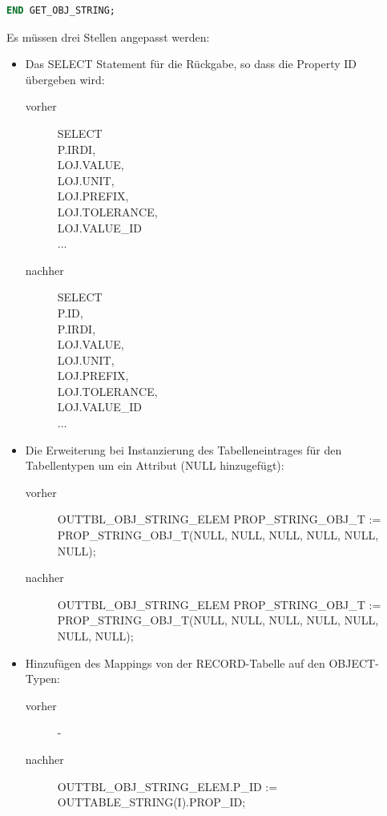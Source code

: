 \begin{lstlisting}[caption=GET\_OBJ\_STRING Anpassung auf Property ID, language=sql, label=lst:get_obj_string_anpassung]
END GET_OBJ_STRING;
\end{lstlisting}
 
Es müssen drei Stellen angepasst werden: 

\begin{itemize}
\item Das SELECT Statement für die Rückgabe, so dass die Property ID übergeben wird: 
  \begin{description}
  \item[vorher] SELECT \\
  P.IRDI, \\
  LOJ.VALUE, \\ 
  LOJ.UNIT, \\
  LOJ.PREFIX, \\ 
  LOJ.TOLERANCE, \\
  LOJ.VALUE\_ID \\
  ...
  \item[nachher] SELECT \\
  P.ID, \\
  P.IRDI, \\ 
  LOJ.VALUE, \\ 
  LOJ.UNIT, \\
  LOJ.PREFIX, \\ 
  LOJ.TOLERANCE, \\ 
  LOJ.VALUE\_ID \\
  ...
  \end{description}
\item Die Erweiterung bei Instanzierung des Tabelleneintrages für den Tabellentypen um ein Attribut (NULL hinzugefügt): 
  \begin{description}
  \item[vorher] OUTTBL\_OBJ\_STRING\_ELEM  PROP\_STRING\_OBJ\_T :=  \\
  PROP\_STRING\_OBJ\_T(NULL, NULL, NULL, NULL, NULL, NULL);
  \item[nachher] OUTTBL\_OBJ\_STRING\_ELEM  PROP\_STRING\_OBJ\_T :=  \\
  PROP\_STRING\_OBJ\_T(NULL, NULL, NULL, NULL, NULL, NULL, NULL);
  \end{description}
\item Hinzufügen des Mappings von der RECORD-Tabelle auf den OBJECT-Typen:
  \begin{description}
  \item[vorher] -
  \item[nachher] OUTTBL\_OBJ\_STRING\_ELEM.P\_ID := OUTTABLE\_STRING(I).PROP\_ID;  
  \end{description}
\end{itemize}
 
